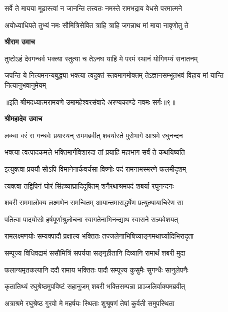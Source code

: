 \twolineshloka
{सर्वे ते मायया मूढास्त्वां न जानन्ति तत्त्वतः}
{नमस्ते रामभद्राय वेधसे परमात्मने} %

\twolineshloka
{अयोध्याधिपते तुभ्यं नमः सौमित्रिसेवित}
{त्राहि त्राहि जगन्नाथ मां माया नावृणोतु ते} %

\textbf{श्रीराम उवाच}

\twolineshloka
{तुष्टोऽहं देवगन्धर्व भक्त्या स्तुत्या च तेऽनघ}
{याहि मे परमं स्थानं योगिगम्यं सनातनम्} %

\fourlineindentedshloka
{जपन्ति ये नित्यमनन्यबुद्ध्या}
{भक्त्या त्वदुक्तं स्तवमागमोक्तम्}
{तेऽज्ञानसम्भूतभवं विहाय}
{मां यान्ति नित्यानुभवानुमेयम्} %

{॥इति श्रीमदध्यात्मरामयणे उमामहेश्वरसंवादे
अरण्यकाण्डे नवमः सर्गः॥९॥
}




\textbf{श्रीमहादेव उवाच}

\twolineshloka
{लब्ध्वा वरं स गन्धर्वः प्रयास्यन् राममब्रवीत्}
{शबर्यास्ते पुरोभागे आश्रमे रघुनन्दन} %

\twolineshloka
{भक्त्या त्वत्पादकमले भक्तिमार्गविशारदा}
{तां प्रयाहि महाभाग सर्वं ते कथयिष्यति} %

\twolineshloka
{इत्युक्त्वा प्रययौ सोऽपि विमानेनार्कवर्चसा}
{विष्णोः पदं रामनामस्मरणे फलमीदृशम्} %

\twolineshloka
{त्यक्त्वा तद्विपिनं घोरं सिंहव्याघ्रादिदूषितम्}
{शनैरथाश्रमपदं शबर्या रघुनन्दनः} %

\twolineshloka
{शबरी राममालोक्य लक्ष्मणेन समन्वितम्}
{आयान्तमाराद्धर्षेण प्रत्युत्थायाचिरेण सा} %

\twolineshloka
{पतित्वा पादयोरग्रे हर्षपूर्णाश्रुलोचना}
{स्वागतेनाभिनन्द्याथ स्वासने सन्न्यवेशयत्} %

\twolineshloka
{रामलक्ष्मणयोः सम्यक्पादौ प्रक्षाल्य भक्तितः}
{तज्जलेनाभिषिच्याङ्गमथार्घ्यादिभिरादृता} %

\twolineshloka
{सम्पूज्य विधिवद्रामं ससौमित्रिं सपर्यया}
{सङ्गृहीतानि दिव्यानि रामार्थं शबरी मुदा} %

\twolineshloka
{फलान्यमृतकल्पानि ददौ रामाय भक्तितः}
{पादौ सम्पूज्य कुसुमैः सुगन्धैः सानुलेपनैः} %

\twolineshloka
{कृतातिथ्यं रघुश्रेष्ठमुपविष्टं सहानुजम्}
{शबरी भक्तिसम्पन्ना प्राञ्जलिर्वाक्यमब्रवीत्} %

\twolineshloka
{अत्राश्रमे रघुश्रेष्ठ गुरवो मे महर्षयः}
{स्थिताः शुश्रूषणं तेषां कुर्वती समुपस्थिता} %


